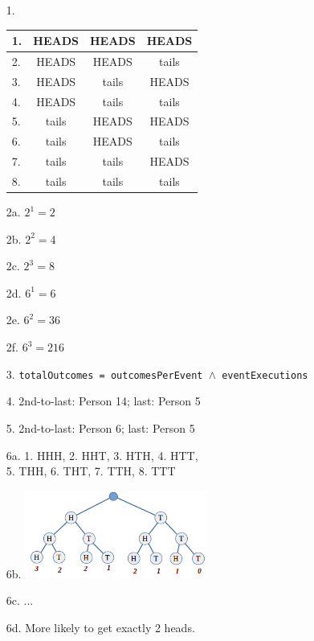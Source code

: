 {    
}{
    \begin{enumerate}
        \item[1.]   
                \begin{tabular}{ | l | c | c | c | }
                    \hline
                    1. & HEADS & HEADS & HEADS \\ \hline
                    2. & HEADS & HEADS & tails \\ \hline
                    3. & HEADS & tails & HEADS \\ \hline
                    4. & HEADS & tails & tails \\ \hline
                    5. & tails & HEADS & HEADS \\ \hline
                    6. & tails & HEADS & tails \\ \hline
                    7. & tails & tails & HEADS \\ \hline
                    8. & tails & tails & tails \\ \hline
                \end{tabular}

        \item[2a.]  $2^{1} = 2$
        \item[2b.]  $2^{2} = 4$
        \item[2c.]  $2^{3} = 8$
        \item[2d.]  $6^{1} = 6$
        \item[2e.]  $6^{2} = 36$
        \item[2f.]  $6^{3} = 216$

        \item[3.]   \texttt{totalOutcomes = outcomesPerEvent $\wedge$ eventExecutions}

        \item[4.]   2nd-to-last: Person 14; last: Person 5

        \item[5.]   2nd-to-last: Person 6; last: Person 5

        \item[6a.]   1. HHH, 2. HHT, 3. HTH, 4. HTT, \\ 5. THH, 6. THT, 7. TTH, 8. TTT
        \item[6b.]  \includegraphics[width=6cm]{images/ans-gametree.png}
        \item[6c.]  ...
        \item[6d.]  More likely to get exactly 2 heads.
    \end{enumerate}
}

    


